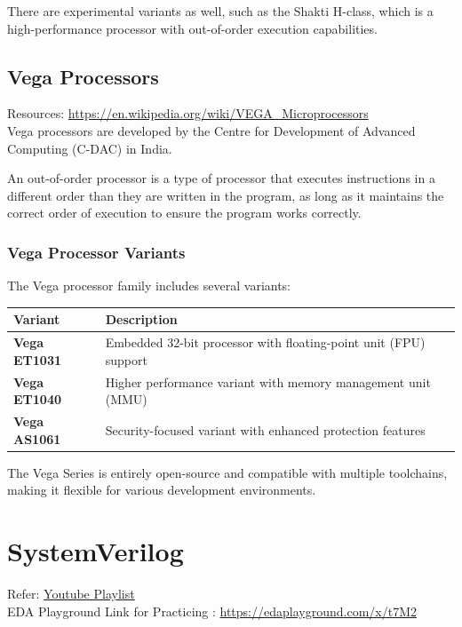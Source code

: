 \documentclass[12pt, a4paper]{article}
\begin{document}
There are experimental variants as well, such as the Shakti H-class, which is a high-performance processor with out-of-order execution capabilities.


\subsection{Vega Processors}
Resources: \url{https://en.wikipedia.org/wiki/VEGA_Microprocessors} \\

Vega processors are developed by the Centre for Development of Advanced Computing (C-DAC) in India.

An out-of-order processor is a type of processor that executes instructions in a different order than they are written in the program, as long as it maintains the correct order of execution to ensure the program works correctly.
\subsubsection{Vega Processor Variants}
The Vega processor family includes several variants:

\begin{center}
\begin{tabular}{|l|p{}|}
\hline
\textbf{Variant} & \textbf{Description} \\
\hline
\textbf{Vega ET1031} & Embedded 32-bit processor with floating-point unit (FPU) support \\
\hline
\textbf{Vega ET1040} & Higher performance variant with memory management unit (MMU) \\
\hline
\textbf{Vega AS1061} & Security-focused variant with enhanced protection features \\
\hline
\end{tabular}
\end{center}

The Vega Series is entirely open-source and compatible with multiple toolchains, making it flexible for various development environments.

\section{SystemVerilog}

Refer: \href{https://youtube.com/playlist?list=PLqPfWwayuBvMwUjNHfyaX6CTK2KbeL2ga&si=NyddrPqUN_h-WrtD}{Youtube Playlist}\\
EDA Playground Link for Practicing : \url{https://edaplayground.com/x/t7M2}
\end{document}
